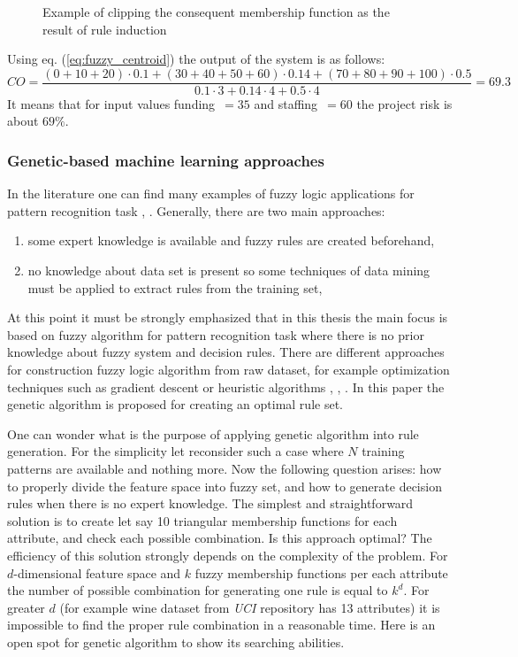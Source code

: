\begin{enumerate}
\begin{figure}[H]
\begin{center}
            \end{center}
            \caption{Example of clipping the consequent membership function
            as the result of rule induction}
            \label{fig:fuzzy_centroid}
        \end{figure}
        Using eq. (\ref{eq:fuzzy_centroid}) the output of the system is as follows:
        $$
        CO = \frac{(0+10+20)\cdot 0.1 + (30+40+50+60)\cdot 0.14 + (70 + 80 + 90
        + 100)\cdot 0.5}{0.1\cdot 3 + 0.14\cdot 4 + 0.5\cdot 4 } = 69.3
        $$
    It means that for input values funding~$=35$ and staffing~$=60$ the project
    risk is about $69\%$.
\end{enumerate}
\subsubsection{Genetic-based machine learning approaches}
In the literature one can find many examples of fuzzy logic
applications for pattern recognition task \cite{bib3}, \cite{bib9}.
Generally, there are two main approaches:
\begin{enumerate}
    \item some expert knowledge is available and fuzzy rules are created
        beforehand,
    \item no knowledge about data set is present so some techniques of data
        mining must be applied to extract rules from the training set,
\end{enumerate}
At this point it must be strongly emphasized that in this thesis the main focus is based on
fuzzy algorithm for pattern recognition task where there is no prior knowledge 
about fuzzy system and decision rules. There are different approaches for
construction fuzzy logic algorithm from raw dataset, for example optimization techniques
such as gradient descent or heuristic algorithms \cite{bib8}, \cite{bib16},
\cite{bib28}. In this paper the genetic algorithm
is proposed for creating an optimal rule set. 

One can wonder what is the purpose of applying genetic algorithm into rule
generation. For the simplicity let reconsider such a case where $N$ training
patterns are available and nothing more. Now the following question arises: 
how to properly divide the feature space into fuzzy set, and how to generate
decision rules when there is no expert knowledge. The simplest and
straightforward solution is to create let say 10 triangular membership functions for each
attribute, and check each possible combination. Is this approach optimal? The
efficiency of this solution strongly depends on the complexity of the problem.
For $d$-dimensional feature space and $k$ fuzzy membership functions per each attribute
the number of possible combination for generating one rule is equal to $k^d$.
For greater $d$ (for example wine dataset from \textit{UCI} repository has 13
attributes) it is impossible to find the proper rule combination in a reasonable
time. Here is an open spot for genetic algorithm to show its searching
abilities.

